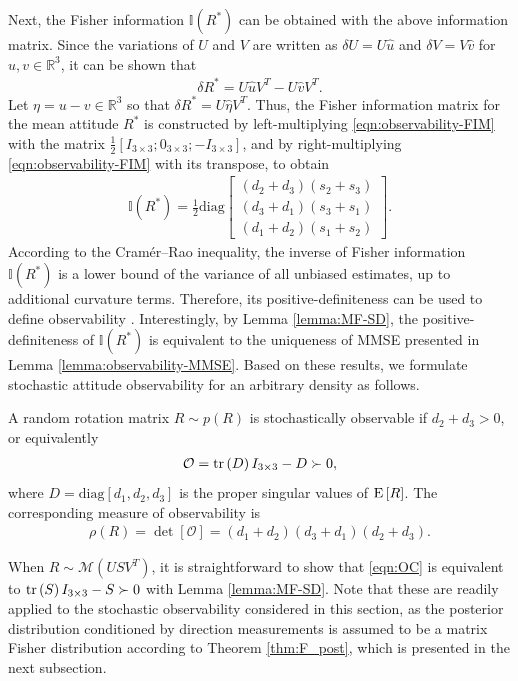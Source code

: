 Next, the Fisher information $\mathbb{I}(R^*)$ can be obtained with the above information matrix.
Since the variations of $U$ and $V$ are written as $\delta U = U\hat u$ and $\delta V= V\hat v$ for $u,v\in\mathbb{R}^3$, it can be shown that
\begin{align*}
	\delta R^* = U\hat u V^T - U\hat vV^T.
\end{align*}
Let $\eta = u-v\in\mathbb{R}^3$ so that $\delta R^* = U\hat\eta V^T$.
Thus, the Fisher information matrix for the mean attitude $R^*$ is constructed by left-multiplying \eqref{eqn:observability-FIM} with the matrix $\frac{1}{2} [I_{3\times 3}; 0_{3\times 3}; -I_{3\times 3}]$, and by right-multiplying \eqref{eqn:observability-FIM} with its transpose, to obtain
\begin{align}
	\mathbb{I}(R^*) = \frac{1}{2} \mathrm{diag} \!
	\begin{bmatrix} (d_2+d_3)(s_2+s_3) \\ (d_3+d_1)(s_3+s_1) \\ (d_1+d_2)(s_1+s_2) \end{bmatrix}.\label{eqn:FIM_eta}
\end{align}
According to the Cram\'{e}r--Rao inequality, the inverse of Fisher information $\mathbb{I}(R^*)$ is a lower bound of the variance of all unbiased estimates, up to additional curvature terms.
Therefore, its positive-definiteness can be used to define observability \cite{mohler1988nonlinear}.
Interestingly, by Lemma \ref{lemma:MF-SD}, the positive-definiteness of $\mathbb{I}(R^*)$ is equivalent to the uniqueness of MMSE presented in Lemma \ref{lemma:observability-MMSE}.
Based on these results, we formulate stochastic attitude observability for an arbitrary density as follows.
\begin{definition} \label{def:observability}
	A random rotation matrix $R\sim p(R)$ is stochastically observable if $d_2+ d_3 >0$, or equivalently
	\begin{align}
		\mathcal{O} = \mathrm{tr}\left( D \right)I_{3\times 3} - D \succ 0,\label{eqn:OC}
	\end{align}
	where $D=\mathrm{diag}[d_1,d_2,d_3]$ is the proper singular values of $\mathrm{E}\left[ R \right]$.  
	The corresponding measure of observability is
	\begin{align}
		\rho(R) = \det[\mathcal{O}] = (d_1+d_2)(d_3+d_1)(d_2+d_3).
	\end{align}
\end{definition}
When $R\sim\mathcal{M}(USV^T)$, it is straightforward to show that \eqref{eqn:OC} is equivalent to $\mathrm{tr}\left( S \right)I_{3\times 3} - S\succ 0$ with Lemma \ref{lemma:MF-SD}.
Note that these are readily applied to the stochastic observability considered in this section, as the posterior distribution conditioned by direction measurements is assumed to be a matrix Fisher distribution according to Theorem \ref{thm:F_post}, which is presented in the next subsection.

